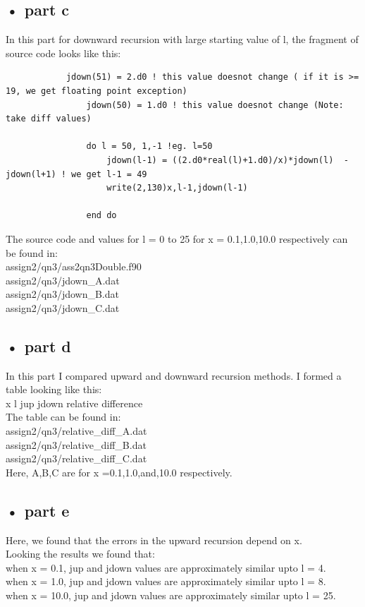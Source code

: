 \documentclass[11pt,a4paper,english]{article}
\begin{document}
	\subsection{• part c}
		In this part for downward recursion with large starting value of l, the
		fragment of source code looks like this:\\
		\begin{verbatim}
			jdown(51) = 2.d0 ! this value doesnot change ( if it is >= 19, we get floating point exception)
    			jdown(50) = 1.d0 ! this value doesnot change (Note: take diff values)

    			do l = 50, 1,-1 !eg. l=50
        			jdown(l-1) = ((2.d0*real(l)+1.d0)/x)*jdown(l)  - jdown(l+1) ! we get l-1 = 49
        			write(2,130)x,l-1,jdown(l-1)
          
    			end do
		\end{verbatim}
		The source code and values for l = 0 to 25 for x = 0.1,1.0,10.0 respectively can be found in:\\
		assign2/qn3/ass2qn3Double.f90\\
		assign2/qn3/jdown\_A.dat \\
		assign2/qn3/jdown\_B.dat \\
		assign2/qn3/jdown\_C.dat \\
		
		
	
	\subsection{• part d}
		In this part I compared upward and downward recursion methods. I formed a table looking like this:\\
		x     l       jup           jdown               relative difference \\
		The table can be found in:\\
		assign2/qn3/relative\_diff\_A.dat \\
		assign2/qn3/relative\_diff\_B.dat \\
		assign2/qn3/relative\_diff\_C.dat \\
		
		Here, A,B,C are for x =0.1,1.0,and,10.0 respectively.
		
	
	\subsection{• part e}
		Here, we found that the errors in the upward recursion depend on x.\\
		Looking the results we found that:\\
		when x = 0.1, jup and jdown values are approximately similar upto l = 4.\\
		when x = 1.0, jup and jdown values are approximately similar upto l = 8.\\
		when x = 10.0, jup and jdown values are approximately similar upto l = 25.\\
		
\end{document}
